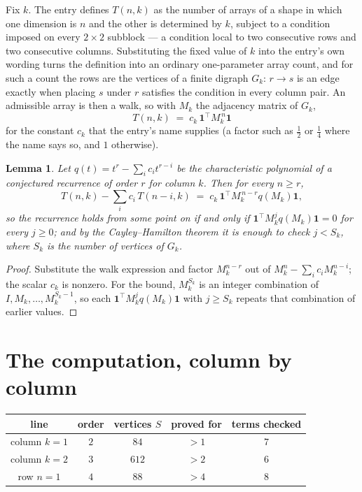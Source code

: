 \documentclass[11pt,a4paper]{article}
\theoremstyle{plain}
\newtheorem{lemma}[theorem]{Lemma}
\theoremstyle{definition}
\begin{document}
Fix $k$. The entry defines $T(n,k)$ as the number of arrays of a shape in which one dimension
is $n$ and the other is determined by $k$, subject to a condition imposed on every
$2\times2$ subblock --- a condition local to two consecutive rows and two consecutive columns.
Substituting the fixed value of $k$ into the entry's own wording turns the definition into an
ordinary one-parameter array count, and for such a count the rows are the vertices of a finite
digraph $G_k$: $r\to s$ is an edge exactly when placing $s$ under $r$ satisfies the condition
in every column pair. An admissible array is then a walk, so with $M_k$ the adjacency matrix
of $G_k$,
\[
T(n,k)\;=\;c_k\,\mathbf{1}^{\!\top}M_k^{\,n}\mathbf{1}
\]
for the constant $c_k$ that the entry's name supplies (a factor such as $\tfrac12$ or
$\tfrac14$ where the name says so, and $1$ otherwise).

\begin{lemma}\label{lem:crit}
Let $q(t)=t^{r}-\sum_i c_it^{r-i}$ be the characteristic polynomial of a conjectured
recurrence of order $r$ for column $k$. Then for every $n\ge r$,
\[
T(n,k)-\sum_i c_i\,T(n-i,k)\;=\;c_k\,\mathbf{1}^{\!\top}M_k^{\,n-r}q(M_k)\mathbf{1},
\]
so the recurrence holds from some point on if and only if
$\mathbf{1}^{\!\top}M_k^{j}q(M_k)\mathbf{1}=0$ for every $j\ge0$; and by the
Cayley--Hamilton theorem it is enough to check $j<S_k$, where $S_k$ is the number of vertices
of $G_k$.
\end{lemma}

\begin{proof}
Substitute the walk expression and factor $M_k^{n-r}$ out of $M_k^{n}-\sum_ic_iM_k^{n-i}$;
the scalar $c_k$ is nonzero. For the bound, $M_k^{S_k}$ is an integer combination of
$I,M_k,\dots,M_k^{S_k-1}$, so each $\mathbf{1}^{\!\top}M_k^{j}q(M_k)\mathbf{1}$ with
$j\ge S_k$ repeats that combination of earlier values.
\end{proof}

\section{The computation, column by column}

\begin{center}
\begin{tabular}{ccccc}
line & order & vertices $S$ & proved for & terms checked \\ \hline
column $k$$=1$ & $2$ & $84$ & $>1$ & $7$ \\
column $k$$=2$ & $3$ & $612$ & $>2$ & $6$ \\
row $n$$=1$ & $4$ & $88$ & $>4$ & $8$ \\
\end{tabular}
\end{center}
\end{document}
